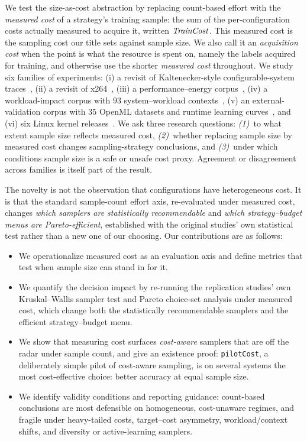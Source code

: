 We test the size-as-cost abstraction by replacing count-based effort with the
\emph{measured cost} of a strategy's training sample: the sum of the
per-configuration costs actually measured to acquire it, written $\mathit{TrainCost}$.
This measured cost is the sampling cost our title sets against sample size. We
also call it an \emph{acquisition cost} when the point is what the resource is
spent on, namely the labels acquired for training, and otherwise use the shorter
\emph{measured cost} throughout. We study six families of experiments: (i) a
\StudyReplicationICSE revisit of Kaltenecker-style configurable-system
traces~\cite{kaltenecker2019}, (ii) a \StudyReplicationICPE revisit of x264~\cite{pereira2020}, %
(iii) a performance--energy
corpus~\cite{weber2023twins}, (iv) a workload-impact corpus with $93$
system--workload contexts~\cite{muhlbauer2023workload}, (v) an \StudyLCBench
external-validation corpus with $35$ OpenML datasets and runtime learning
curves~\cite{zimmer2021autopytorch}, and (vi) six Linux kernel
releases~\cite{martin2022linux,borges2025linux}. We ask three research questions:
\emph{(1)}~to what extent sample size reflects measured cost,
\emph{(2)}~whether replacing sample size by measured cost changes
sampling-strategy conclusions, and \emph{(3)}~under which conditions sample size
is a safe or unsafe cost proxy. Agreement or disagreement across families is
itself part of the result.

The novelty is not the observation that configurations have heterogeneous
cost. %
It is that the standard sample-count effort axis,
re-evaluated under measured cost, changes \emph{which samplers are
statistically recommendable} and \emph{which strategy--budget menus are
Pareto-efficient}, established with the original studies' own statistical test
rather than a new one of our choosing. Our contributions are as follows:

\begin{itemize}
    \item We operationalize measured cost as an evaluation axis and
    define metrics that test
    when sample size can stand in for it.
    \item We quantify the decision impact by re-running the replication studies'
    own Kruskal--Wallis sampler test and Pareto choice-set analysis under measured
    cost, which change both the statistically recommendable samplers and the
    efficient strategy--budget menu.
    \item We show that measuring cost surfaces \emph{cost-aware} samplers that
    are off the radar under sample count, and give an existence proof:
    \texttt{pilotCost}, a deliberately simple pilot of cost-aware sampling, is on
    several systems the most cost-effective choice: better accuracy at equal sample size.
    \item We identify validity conditions and reporting guidance: count-based
    conclusions are most defensible on homogeneous, cost-unaware regimes, and
    fragile under heavy-tailed costs, target--cost asymmetry, workload/context
    shifts, and diversity or active-learning samplers.
\end{itemize}
